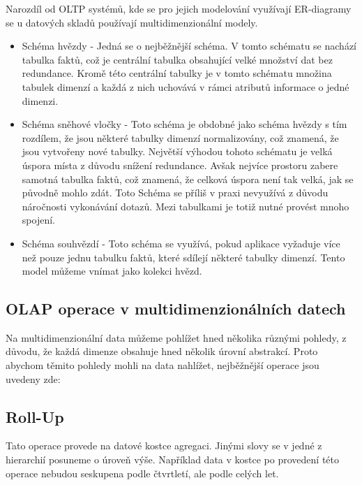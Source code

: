 Narozdíl od OLTP systémů, kde se pro jejich modelování využívají ER-diagramy se u datových skladů používají multidimenzionální modely. \cite[Kapitola~4]{Kamber}

\begin{itemize}
    \item{Schéma hvězdy - Jedná se o nejběžnější schéma. V tomto schématu se nachází tabulka faktů, což je centrální tabulka obsahující velké množství dat bez redundance. Kromě této centrální tabulky je v tomto schématu množina tabulek dimenzí a každá z nich uchovává v rámci atributů informace o jedné dimenzi.}
    
    \item{Schéma sněhové vločky - Toto schéma je obdobné jako schéma hvězdy s tím rozdílem, že jsou některé tabulky dimenzí normalizovány, což znamená, že jsou vytvořeny nové tabulky. Největší výhodou tohoto schématu je velká úspora místa z důvodu snížení redundance. Avšak nejvíce prostoru zabere samotná tabulka faktů, což znamená, že celková úspora není tak velká, jak se původně mohlo zdát. Toto Schéma se příliš v praxi nevyužívá z důvodu náročnosti vykonávání dotazů. Mezi tabulkami je totiž nutné provést mnoho spojení.}
    
    \item{Schéma souhvězdí - Toto schéma se využívá, pokud aplikace vyžaduje více než pouze jednu tabulku faktů, které sdílejí některé tabulky dimenzí. Tento model můžeme vnímat jako kolekci hvězd.}
\end{itemize}

\subsection*{OLAP operace v multidimenzionálních datech}

Na multidimenzionální data můžeme pohlížet hned několika různými pohledy, z důvodu, že každá dimenze obsahuje hned několik úrovní abstrakcí. Proto abychom těmito pohledy mohli na data nahlížet, nejběžnější operace jsou uvedeny zde: \cite[Kapitola~4]{Kamber}

\subsection*{Roll-Up}

Tato operace provede na datové kostce agregaci. Jinými slovy se v jedné z hierarchií posuneme o úroveň výše. Například data v kostce po provedení této operace nebudou seskupena podle čtvrtletí, ale podle celých let.

